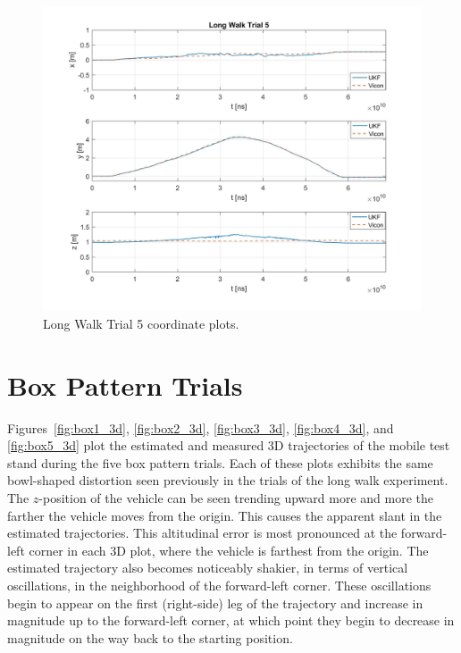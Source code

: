 \begin{figure}[H]
  \centering
    \includegraphics[width=\textwidth]{longWalk5_xyz}
  \caption[Long Walk Trial 5]{Long Walk Trial 5 coordinate plots.}
  \label{fig:longWalk5_xyz}
\end{figure}
\clearpage

\section{Box Pattern Trials}

Figures~\ref{fig:box1_3d}, \ref{fig:box2_3d}, \ref{fig:box3_3d}, \ref{fig:box4_3d}, and \ref{fig:box5_3d} plot the estimated and measured 3D trajectories of the mobile test stand during the five box pattern trials. Each of these plots exhibits the same bowl-shaped distortion seen previously in the trials of the long walk experiment. The $z$-position of the vehicle can be seen trending upward more and more the farther the vehicle moves from the origin. This causes the apparent slant in the estimated trajectories. This altitudinal error is most pronounced at the forward-left corner in each 3D plot, where the vehicle is farthest from the origin. The estimated trajectory also becomes noticeably shakier, in terms of vertical oscillations, in the neighborhood of the forward-left corner. These oscillations begin to appear on the first (right-side) leg of the trajectory and increase in magnitude up to the forward-left corner, at which point they begin to decrease in magnitude on the way back to the starting position.

